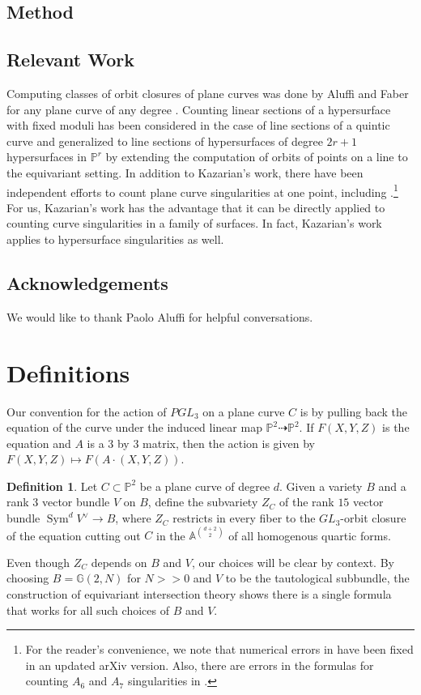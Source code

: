 \documentclass{article}
\theoremstyle{definition}
\newtheorem{defn}[thm]{Definition}
\newcommand{\on}{\operatorname}
\newcommand{\mb}{\mathbb}
\begin{document}
\subsection{Method}

\subsection{Relevant Work}
Computing classes of orbit closures of plane curves was done by Aluffi and Faber for any plane curve of any degree \cite{AF00}. Counting linear sections of a hypersurface with fixed moduli has been considered in the case of line sections of a quintic curve \cite{CL08} and generalized to line sections of hypersurfaces of degree $2r+1$ hypersurfaces in $\mb{P}^r$ \cite{FML} by extending the computation of orbits of points on a line \cite{AFpoint} to the equivariant setting. In addition to Kazarian's work, there have been independent efforts to count plane curve singularities at one point, including \cite{BM16,K06,H03}.\footnote{For the reader's convenience, we note that numerical errors in \cite{K06} have been fixed in an updated arXiv version. Also, there are errors in the formulas for counting $A_6$ and $A_7$ singularities in \cite{H03}.} For us, Kazarian's work has the advantage that it can be directly applied to counting curve singularities in a family of surfaces. In fact, Kazarian's work applies to hypersurface singularities as well. 

\subsection{Acknowledgements}
We would like to thank Paolo Aluffi for helpful conversations.

\section{Definitions}
Our convention for the action of $PGL_3$ on a plane curve $C$ is by pulling back the equation of the curve under the induced linear map $\mb{P}^2\dashrightarrow\mb{P}^2$. If $F(X,Y,Z)$ is the equation and $A$ is a 3 by 3 matrix, then the action is given by $F(X,Y,Z)\mapsto F(A\cdot(X,Y,Z))$. 
\begin{defn}
Let $C\subset \mb{P}^2$ be a plane curve of degree $d$. Given a variety $B$ and a rank 3 vector bundle $V$ on $B$, define the subvariety $Z_C$ of the rank $15$ vector bundle $\on{Sym}^dV^{\vee}\to B$, where $Z_C$ restricts in every fiber to the $GL_3$-orbit closure of the equation cutting out $C$ in the $\mb{A}^{\binom{d+2}{2}}$ of all homogenous quartic forms.
\end{defn}
Even though $Z_C$ depends on $B$ and $V$, our choices will be clear by context. By choosing $B=\mb{G}(2,N)$ for $N>>0$ and $V$ to be the tautological subbundle, the construction of equivariant intersection theory \cite{EG98} shows there is a single formula that works for all such choices of $B$ and $V$.
\end{document}
